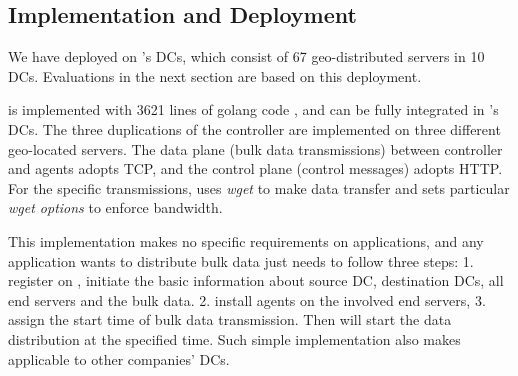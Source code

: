 \subsection{Implementation and Deployment}
\label{sec:deployment}


We have deployed \name on \company's DCs, which consist of 67 geo-distributed servers in 10 DCs. Evaluations in the next section are based on this deployment. %

\name is implemented with 3621 lines of golang code \cite{golang}, and can be fully integrated in \company's DCs. The three duplications of the controller are implemented on three different geo-located servers. The data plane (bulk data transmissions) between controller and agents adopts TCP, and the control plane (control messages) adopts HTTP. For the specific transmissions, \name uses \emph{wget} to make data transfer and sets particular \emph{wget options} to enforce bandwidth.

This implementation makes no specific requirements on applications, and any application wants to distribute bulk data just needs to follow three steps: 1. register on \name, initiate the basic information about source DC, destination DCs, all end servers and the bulk data. 2. install agents on the involved end servers, 3. assign the start time of bulk data transmission. Then \name will start the data distribution at the specified time. Such simple implementation also makes \name applicable to other companies' DCs. 	






%
%
%
%
%

